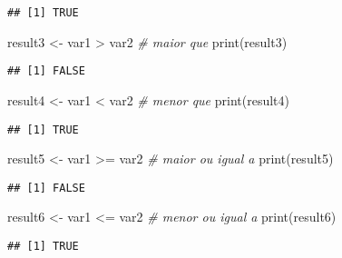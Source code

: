 \documentclass[
]{article}
\newenvironment{Shaded}{\begin{snugshade}}{\end{snugshade}}
\newcommand{\CommentTok}[1]{\textcolor[rgb]{0.56,0.35,0.01}{\textit{#1}}}
\newcommand{\FunctionTok}[1]{\textcolor[rgb]{0.00,0.00,0.00}{#1}}
\newcommand{\NormalTok}[1]{#1}
\newcommand{\OtherTok}[1]{\textcolor[rgb]{0.56,0.35,0.01}{#1}}
\newcommand{\SpecialCharTok}[1]{\textcolor[rgb]{0.00,0.00,0.00}{#1}}
\begin{document}
\begin{verbatim}
## [1] TRUE
\end{verbatim}

\begin{Shaded}
\begin{Highlighting}[]
\NormalTok{result3 }\OtherTok{\textless{}{-}}\NormalTok{ var1 }\SpecialCharTok{\textgreater{}}\NormalTok{ var2  }\CommentTok{\# maior que}
\FunctionTok{print}\NormalTok{(result3)}
\end{Highlighting}
\end{Shaded}

\begin{verbatim}
## [1] FALSE
\end{verbatim}

\begin{Shaded}
\begin{Highlighting}[]
\NormalTok{result4 }\OtherTok{\textless{}{-}}\NormalTok{ var1 }\SpecialCharTok{\textless{}}\NormalTok{ var2  }\CommentTok{\# menor que}
\FunctionTok{print}\NormalTok{(result4)}
\end{Highlighting}
\end{Shaded}

\begin{verbatim}
## [1] TRUE
\end{verbatim}

\begin{Shaded}
\begin{Highlighting}[]
\NormalTok{result5 }\OtherTok{\textless{}{-}}\NormalTok{ var1 }\SpecialCharTok{\textgreater{}=}\NormalTok{ var2 }\CommentTok{\# maior ou igual a}
\FunctionTok{print}\NormalTok{(result5)}
\end{Highlighting}
\end{Shaded}

\begin{verbatim}
## [1] FALSE
\end{verbatim}

\begin{Shaded}
\begin{Highlighting}[]
\NormalTok{result6 }\OtherTok{\textless{}{-}}\NormalTok{ var1 }\SpecialCharTok{\textless{}=}\NormalTok{ var2 }\CommentTok{\# menor ou igual a}
\FunctionTok{print}\NormalTok{(result6)}
\end{Highlighting}
\end{Shaded}

\begin{verbatim}
## [1] TRUE
\end{verbatim}
\end{document}
